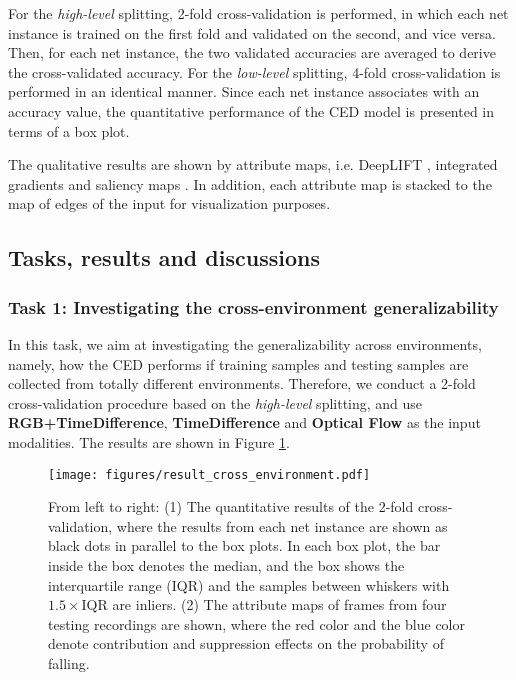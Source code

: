 \documentclass[runningheads]{llncs}
\begin{document}
For the {\em high-level} splitting, 2-fold cross-validation is performed, in which each net instance is trained on the first fold and validated on the second, and vice versa. Then, for each net instance, the two validated accuracies are averaged to derive the cross-validated accuracy. For the {\em low-level} splitting, 4-fold cross-validation is performed in an identical manner. Since each net instance associates with an accuracy value, the quantitative performance of the CED model is presented in terms of a box plot. 

The qualitative results are shown by attribute maps, i.e. DeepLIFT \cite{shrikumar2017learning}, integrated gradients \cite{ancona2017unified} and saliency maps \cite{simonyan2013deep}. In addition, each attribute map is stacked to the map of edges of the input for visualization purposes. 



\subsection{Tasks, results and discussions}


\subsubsection{Task 1: Investigating the cross-environment generalizability}
In this task, we aim at investigating the generalizability across environments, namely, how the CED performs if training samples and testing samples are collected from totally different environments. Therefore, we conduct a 2-fold cross-validation procedure based on the {\em high-level} splitting, and use {\bf RGB+TimeDifference}, {\bf TimeDifference} and {\bf Optical Flow} as the input modalities. The results are shown in Figure \ref{fig:cross_environment}.

\begin{figure}
\centering
\texttt{[image: figures/result\_cross\_environment.pdf]}
\caption{From left to right: (1) The quantitative results of the 2-fold cross-validation, where the results from each net instance are shown as black dots in parallel to the box plots. In each box plot, the bar inside the box denotes the median, and the box shows the interquartile range (IQR) and the samples between whiskers with $1.5 \times$IQR are inliers. (2) The attribute maps of frames from four testing recordings are shown, where the red color and the blue color denote contribution and suppression effects on the probability of falling.}
\label{fig:cross_environment}
\end{figure}
\end{document}
